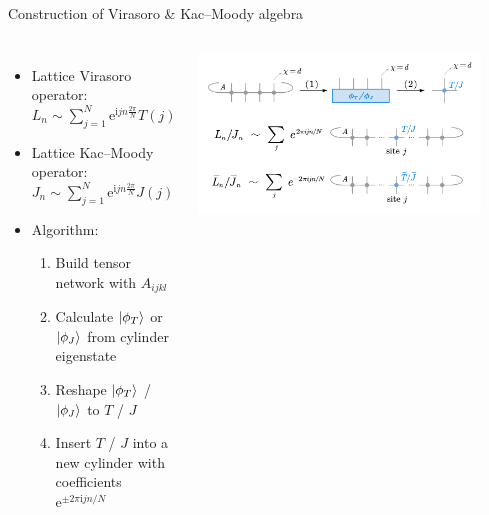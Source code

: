 \documentclass{fdubeamer}
\newcommand{\ee}{\mathrm{e}}
\newcommand{\ii}{\mathrm{i}}
\newcommand{\1}{\mathbb{1}}
\begin{document}
\begin{frame}{Construction of Virasoro \& Kac--Moody algebra}

\begin{columns}[c]


    \begin{itemize}
      \item Lattice Virasoro operator: \\
        \mbox{\quad} $L_n \sim \sum_{j=1}^N \ee^{ \ii j n \frac{2\pi}{N}} T(j)$
      \item Lattice Kac--Moody operator: \\
        \mbox{\quad} $J_n \sim \sum_{j=1}^N \ee^{ \ii j n \frac{2\pi}{N}} J(j)$
      \item Algorithm:

        \begin{enumerate}
          \item Build tensor network with $A_{ijkl}$
          \item Calculate $\ket{\phi_T}$ or $\ket{\phi_J}$ from cylinder eigenstate
          \item Reshape $\ket{\phi_T}$ / $\ket{\phi_J}$ to $T$ / $J$
          \item Insert $T$ / $J$ into a new cylinder with coefficients $\ee^{\pm2\pi\ii j n/N}$
        \end{enumerate}
    \end{itemize}


    \centering
    \includegraphics[width=0.9\textwidth]{images/virasoro/construction.pdf}

\end{columns}


\end{frame}
\end{document}
